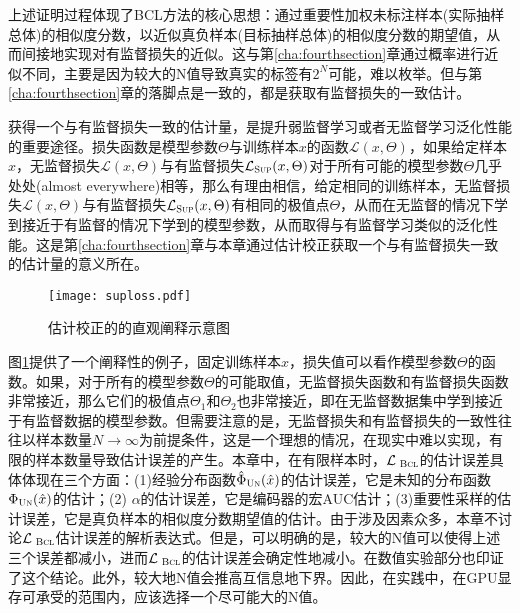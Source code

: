 上述证明过程体现了BCL方法的核心思想：通过重要性加权未标注样本(实际抽样总体)的相似度分数，以近似真负样本(目标抽样总体)的相似度分数的期望值，从而间接地实现对有监督损失的近似。这与第\ref{cha:fourthsection}章通过概率进行近似不同，主要是因为较大的N值导致真实的标签有$2^N$可能，难以枚举。但与第\ref{cha:fourthsection}章的落脚点是一致的，都是获取有监督损失的一致估计。

获得一个与有监督损失一致的估计量，是提升弱监督学习或者无监督学习泛化性能的重要途径。损失函数是模型参数$\Theta$与训练样本$x$的函数$\mathcal{L}(x,\Theta)$，如果给定样本$x$，无监督损失$\mathcal{L}(x,\Theta)$与有监督损失$\mathcal{L}_\textsc{Sup}(x,\Theta)$对于所有可能的模型参数$\Theta$几乎处处(almost everywhere)相等，那么有理由相信，给定相同的训练样本，无监督损失$\mathcal{L}(x,\Theta)$与有监督损失$\mathcal{L}_\textsc{Sup}(x,\Theta)$有相同的极值点$\Theta$，从而在无监督的情况下学到接近于有监督的情况下学到的模型参数，从而取得与有监督学习类似的泛化性能。这是第\ref{cha:fourthsection}章与本章通过估计校正获取一个与有监督损失一致的估计量的意义所在。
\begin{figure}[!]
	\centering
	\texttt{[image: suploss.pdf]}
	\caption{估计校正的的直观阐释示意图}
	\label{Fig:suploss}
\end{figure}

图\ref{Fig:suploss}提供了一个阐释性的例子，固定训练样本$x$，损失值可以看作模型参数$\Theta$的函数。如果，对于所有的模型参数$\Theta$的可能取值，无监督损失函数和有监督损失函数非常接近，那么它们的极值点$\Theta_1$和$\Theta_2$也非常接近，即在无监督数据集中学到接近于有监督数据的模型参数。但需要注意的是，无监督损失和有监督损失的一致性往往以样本数量$N\rightarrow \infty$为前提条件，这是一个理想的情况，在现实中难以实现，有限的样本数量导致估计误差的产生。本章中，在有限样本时，$\mathcal{L}_\textsc{~Bcl}$的估计误差具体体现在三个方面：(1)经验分布函数$\hat{\Phi}_\textsc{Un}(\hat{x})$的估计误差，它是未知的分布函数${\Phi}_\textsc{Un}(\hat{x})$的估计；(2) $\alpha$的估计误差，它是编码器的宏AUC估计；(3)重要性采样的估计误差，它是真负样本的相似度分数期望值的估计。由于涉及因素众多，本章不讨论$\mathcal{L}_\textsc{~Bcl}$估计误差的解析表达式。但是，可以明确的是，较大的N值可以使得上述三个误差都减小，进而$\mathcal{L}_\textsc{~Bcl}$的估计误差会确定性地减小。在数值实验部分也印证了这个结论。此外，较大地N值会推高互信息地下界。因此，在实践中，在GPU显存可承受的范围内，应该选择一个尽可能大的N值。

